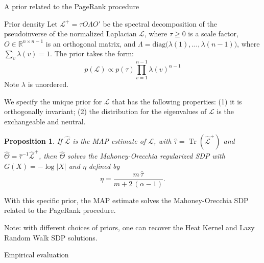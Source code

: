 \documentclass[xcolor=dvipsnames]{beamer}
\DeclareMathOperator{\Tr}{Tr}
\newtheorem{proposition}[theorem]{Proposition}
\begin{document}
\begin{frame}[c]
  \begin{block}{}
  \begin{center}
    \huge{A prior related to the PageRank procedure}
  \end{center}
  \end{block}
\end{frame}


\begin{frame}
  \begin{block}{Prior density}
    Let $\mathcal{L}^{+} = \tau O \Lambda O'$ be the spectral decomposition of
    the pseudoinverse of the normalized Laplacian $\mathcal{L}$, where
    $\tau \geq 0$ is a scale factor, $O \in \mathbb{R}^{n \times n - 1}$ is
    an orthogonal matrix, and
    $\Lambda = \mathrm{diag}\big(\lambda(1), \dotsc, \lambda(n-1)\big)$,
    where $\sum_v \lambda(v) = 1$.  The prior takes the form:
    \[
      p(\mathcal{L}) \propto p(\tau) \prod_{v=1}^{n-1} \lambda(v)^{\alpha - 1}
    \]
    Note $\lambda$ is unordered.
  \end{block}

  We specify the unique prior for $\mathcal{L}$ that has the following properties:
  (1) it is orthogonally invariant; (2) the distribution for the eigenvalues
  of $\mathcal{L}$ is the exchangeable and neutral.
\end{frame}


\begin{frame}
  \begin{proposition}\label{P:map-sdp}
    If $\mathcal{\hat L}$ is the MAP estimate of $\mathcal{L}$, with
    $\hat \tau = \Tr(\mathcal{\hat L}^+)$ and
    $\hat \Theta = \hat \tau^{-1} \mathcal{\hat L}^+$,
    then $\hat \Theta$ solves
    the Mahoney-Orecchia regularized SDP with $G(X) = -\log |X|$ and
    $\eta$ defined by
    \[
      \eta = \frac{m \, \hat \tau}{m + 2\,(\alpha - 1)}.
    \]
  \end{proposition}
 
  With this specific prior, the MAP estimate solves the Mahoney-Orecchia SDP
  related to the PageRank procedure.  

  Note: with different choices of priors, one can recover the Heat Kernel 
  and Lazy Random Walk SDP solutions.
\end{frame}

\begin{frame}[c]
  \begin{block}{}
  \begin{center}
    \huge{Empirical evaluation}
  \end{center}
  \end{block}
\end{frame}
\end{document}
